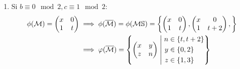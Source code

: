 \documentclass{article}
\newcommand{\suchthat}{\;\ifnum\currentgrouptype=16 \middle\fi|\;}
\begin{document}
\begin{enumerate}
		\item Si $b \equiv0 \mod 2,  c \equiv 1 \mod 2$:
		\begin{align*}
		\phi(\mathcal{M}) = 
		\begin{pmatrix}
		x & 0 \\
		1 & t 
		\end{pmatrix}  & \implies
		\phi(\overline{\mathcal{M}}) = 
		\phi(\mathcal{M}\mathbb{S}) = \left\{
		\begin{pmatrix}
		x & 0 \\
		1 & t 
		\end{pmatrix},
		\begin{pmatrix}
		x & 0 \\
		1 & t+2 
		\end{pmatrix},
		\right\} \\ & \implies
		\varphi(\overline{\mathcal{M}}) =
		\left\{
		\begin{pmatrix}
		x & y \\
		z & n
		\end{pmatrix} \suchthat 	
		\begin{aligned}
		n &\in \{t, t+2\} \\
		y &\in \{0, 2\} \\
		z &\in \{1, 3\} 
		\end{aligned}					
		\right\} 
		\end{align*}
		

\end{enumerate}
\end{document}
